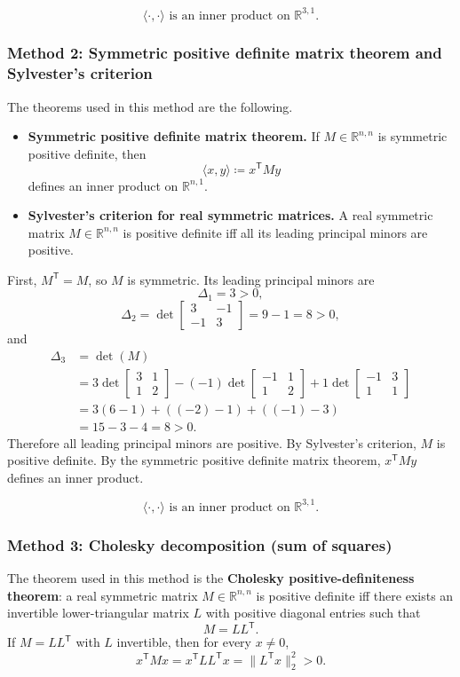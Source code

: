\documentclass[12pt]{article}
\newcommand{\df}{\coloneqq}
\newcommand{\R}{\mathbb{R}}
\begin{document}
\[
\boxed{\,\langle\cdot,\cdot\rangle \text{ is an inner product on }\R^{3,1}.\,}
\]

\newpage
\subsubsection{Method 2: Symmetric positive definite matrix theorem and Sylvester's criterion}
The theorems used in this method are the following.
\begin{itemize}[leftmargin=*]
  \item \textbf{Symmetric positive definite matrix theorem.} If $M\in\R^{n,n}$ is symmetric positive definite, then
  \[
  \langle x,y\rangle\df x^{\mathsf T}My
  \]
  defines an inner product on $\R^{n,1}$.
  \item \textbf{Sylvester's criterion for real symmetric matrices.} A real symmetric matrix $M\in\R^{n,n}$ is positive definite iff all its leading principal minors are positive.
\end{itemize}

First, $M^{\mathsf T}=M$, so $M$ is symmetric. Its leading principal minors are
\[
\Delta_1=3>0,
\]
\[
\Delta_2=
\det\begin{bmatrix}3&-1\\-1&3\end{bmatrix}
=9-1=8>0,
\]
and
\begin{align*}
\Delta_3
&=\det(M)\\
&=3\det\begin{bmatrix}3&1\\1&2\end{bmatrix}
-(-1)\det\begin{bmatrix}-1&1\\1&2\end{bmatrix}
+1\det\begin{bmatrix}-1&3\\1&1\end{bmatrix}\\
&=3(6-1)+((-2)-1)+((-1)-3)\\
&=15-3-4=8>0.
\end{align*}
Therefore all leading principal minors are positive. By Sylvester's criterion, $M$ is positive definite. By the symmetric positive definite matrix theorem, $x^{\mathsf T}My$ defines an inner product.

\[
\boxed{\,\langle\cdot,\cdot\rangle \text{ is an inner product on }\R^{3,1}.\,}
\]

\newpage
\subsubsection{Method 3: Cholesky decomposition (sum of squares)}
The theorem used in this method is the \textbf{Cholesky positive-definiteness theorem}: a real symmetric matrix $M\in\R^{n,n}$ is positive definite iff there exists an invertible lower-triangular matrix $L$ with positive diagonal entries such that
\[
M=LL^{\mathsf T}.
\]
If $M=LL^{\mathsf T}$ with $L$ invertible, then for every $x\neq 0$,
\[
x^{\mathsf T}Mx=x^{\mathsf T}LL^{\mathsf T}x=\|L^{\mathsf T}x\|_2^2>0.
\]
\end{document}
